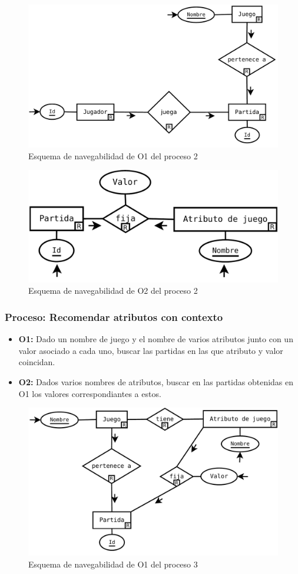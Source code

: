 \begin{figure}[h!]
	\centering
	\includegraphics[width=0.5\linewidth]{../Diagramas/pdf/Op2-1.pdf}
	\caption{Esquema de navegabilidad de O1 del proceso 2}
\end{figure}

\begin{figure}[h!]
	\centering
	\includegraphics[width=0.5\linewidth]{../Diagramas/pdf/Op2-2.pdf}
	\caption{Esquema de navegabilidad de O2 del proceso 2}
\end{figure}



\subsubsection{Proceso: Recomendar atributos con contexto}

\begin{itemize}
	\item \textbf{O1:} Dado un nombre de juego y el nombre de varios
		atributos junto con un valor asociado a cada uno, 
		buscar las partidas en las que atributo y valor coincidan.\\
	\item \textbf{O2:} Dados varios nombres de atributos, buscar en las
		partidas obtenidas en O1 los valores correspondiantes a
		estos.\\
\end{itemize}

\begin{figure}[h!]
	\centering
	\includegraphics[width=0.5\linewidth]{../Diagramas/pdf/Op3-1.pdf}
	\caption{Esquema de navegabilidad de O1 del proceso 3}
\end{figure}

